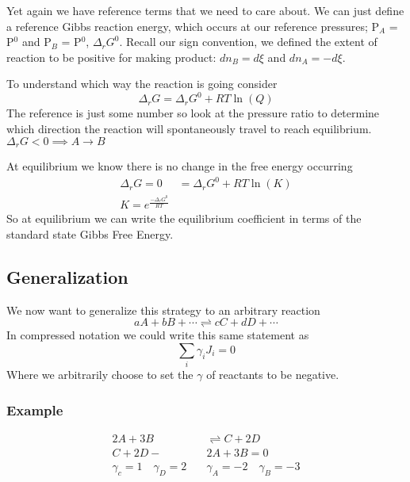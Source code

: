 \documentclass{article}
\begin{document}
Yet again we have reference terms that we need to care about. 
We can just define a  reference Gibbs reaction energy, which occurs at our reference pressures; P$_A$ = P$^0$ and  P$_B$ = P$^0$, $\Delta_rG^0$. 
Recall our sign convention, we defined the extent of reaction to be positive for making product:  $dn_B = d\xi$ and $dn_A = -d\xi$. 

To understand which way the reaction is going consider 
\begin{equation}
    \Delta_rG = \Delta_rG^0 + RT\ln(Q)
\end{equation}
The reference is just some number so look at the pressure ratio to determine which direction the reaction will spontaneously travel to reach equilibrium. 
% 
$\Delta_rG < 0 \implies A \rightarrow B$
%

At equilibrium we know there is no change in the free energy occurring
\begin{equation}
\begin{split}
    \Delta_rG = 0 &= \Delta_rG^0 + RT\ln(K)\\
    K = e^{\frac{-\Delta_rG^0}{RT}}
    \end{split}
\end{equation}
So at equilibrium we can write the equilibrium coefficient in terms of the standard state Gibbs Free Energy. 

\subsection*{Generalization}
We now want to generalize this strategy to an arbitrary reaction
\begin{equation}
aA + bB + \cdots \rightleftharpoons cC + dD + \cdots
\end{equation}
In compressed notation we could write this same statement as 
\begin{equation}
\sum_i \gamma_iJ_i = 0
\end{equation}
Where we arbitrarily choose to set the $\gamma$ of reactants to be negative. 

\subsubsection*{Example}
\begin{equation}
\begin{split}
2A + 3B &\rightleftharpoons C + 2D \\
C + 2D - &2A + 3B = 0 \\
\gamma_c = 1 \quad \gamma_D = 2 \quad &\gamma_A = -2 \quad \gamma_B = -3
\end{split}
\end{equation}
\end{document}
